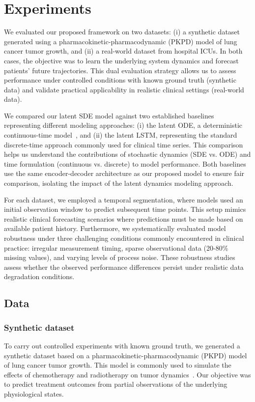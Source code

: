 \documentclass[preprint,12pt]{elsarticle}
\begin{document}
\section{Experiments}
We evaluated our proposed framework on two datasets: (i) a synthetic dataset generated using a pharmacokinetic-pharmacodynamic (PKPD) model of lung cancer tumor growth, and (ii) a real-world dataset from hospital ICUs. In both cases, the objective was to learn the underlying system dynamics and forecast patients' future trajectories. 
This dual evaluation strategy allows us to assess performance under controlled conditions with known ground truth (synthetic data) and validate practical applicability in realistic clinical settings (real-world data).

We compared our latent SDE model against two established baselines representing different modeling approaches: (i) the latent ODE, a deterministic continuous-time model~\citep{rubanova2019latent}, and (ii) the latent LSTM, representing the standard discrete-time approach commonly used for clinical time series. This comparison helps us understand the contributions of stochastic dynamics (SDE vs. ODE) and time formulation (continuous vs. discrete) to model performance. Both baselines use the same encoder-decoder architecture as our proposed model to ensure fair comparison, isolating the impact of the latent dynamics modeling approach.

For each dataset, we employed a temporal segmentation, where models used an initial observation window to predict subsequent time points. This setup mimics realistic clinical forecasting scenarios where predictions must be made based on available patient history. Furthermore, we systematically evaluated model robustness under three challenging conditions commonly encountered in clinical practice: irregular measurement timing, sparse observational data (20-80\% missing values), and varying levels of process noise. These robustness studies assess whether the observed performance differences persist under realistic data degradation conditions.

\subsection{Data}

\subsubsection{Synthetic dataset}
To carry out controlled experiments with known ground truth, we generated a synthetic dataset based on a pharmacokinetic-pharmacodynamic (PKPD) model of lung cancer tumor growth. This model is commonly used to simulate the effects of chemotherapy and radiotherapy on tumor dynamics~\citep{kacprzyk2024ode}. Our objective was to predict treatment outcomes from partial observations of the underlying physiological states. 
\end{document}
